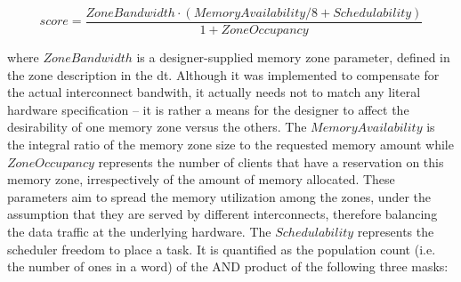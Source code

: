 \[
	score = \frac{ZoneBandwidth \cdot \left(MemoryAvailability/8 + Schedulability\right)}{1 + ZoneOccupancy}
\]

where $ZoneBandwidth$ is a designer-supplied memory zone parameter, defined in the zone description in the \gls{dt}.
Although it was implemented to compensate for the actual interconnect bandwith,
it actually needs not to match any literal hardware specification -- it is rather a means for the designer to affect the
desirability of one memory zone versus the others. The $MemoryAvailability$ is the integral ratio of the memory zone size
to the requested memory amount while $ZoneOccupancy$ represents the number of clients that have a reservation on this
memory zone, irrespectively of the amount of memory allocated. These parameters aim to spread the memory utilization 
among the zones, under the assumption that they are served by different interconnects, therefore balancing the data
traffic at the underlying hardware. The $Schedulability$ represents the scheduler freedom to place a task.
It is quantified as the population count (i.e. the number of ones in a word) of the AND product of the following three masks: 

